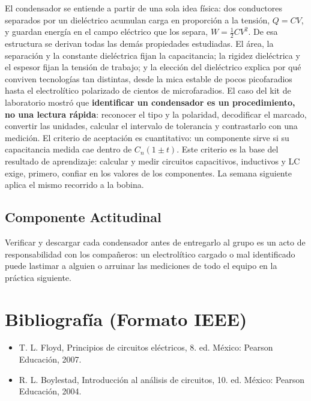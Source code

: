 \documentclass[11pt,letterpaper]{article}
\begin{document}
El condensador se entiende a partir de una sola idea física: dos conductores separados por un dieléctrico acumulan carga en proporción a la tensión, $Q = CV$, y guardan energía en el campo eléctrico que los separa, $W = \tfrac{1}{2}CV^2$. De esa estructura se derivan todas las demás propiedades estudiadas. El área, la separación y la constante dieléctrica fijan la capacitancia; la rigidez dieléctrica y el espesor fijan la tensión de trabajo; y la elección del dieléctrico explica por qué conviven tecnologías tan distintas, desde la mica estable de pocos picofaradios hasta el electrolítico polarizado de cientos de microfaradios. El caso del kit de laboratorio mostró que \textbf{identificar un condensador es un procedimiento, no una lectura rápida}: reconocer el tipo y la polaridad, decodificar el marcado, convertir las unidades, calcular el intervalo de tolerancia y contrastarlo con una medición. El criterio de aceptación es cuantitativo: un componente sirve si su capacitancia medida cae dentro de $C_n(1 \pm t)$. Este criterio es la base del resultado de aprendizaje: calcular y medir circuitos capacitivos, inductivos y LC exige, primero, confiar en los valores de los componentes. La semana siguiente aplica el mismo recorrido a la bobina.

\subsection*{Componente Actitudinal}

\begin{cita}
Verificar y descargar cada condensador antes de entregarlo al grupo es un acto de responsabilidad con los compañeros: un electrolítico cargado o mal identificado puede lastimar a alguien o arruinar las mediciones de todo el equipo en la práctica siguiente.
\end{cita}

\section{Bibliografía (Formato IEEE)}

{\sloppy
\begin{itemize}[leftmargin=2.6em, labelwidth=2.2em, labelsep=0.4em, align=left]
  \item[{[1]}] T. L. Floyd, Principios de circuitos eléctricos, 8.\textordfeminine{} ed. México: Pearson Educación, 2007.
  \item[{[2]}] R. L. Boylestad, Introducción al análisis de circuitos, 10.\textordfeminine{} ed. México: Pearson Educación, 2004.
\end{itemize}
}
\end{document}
